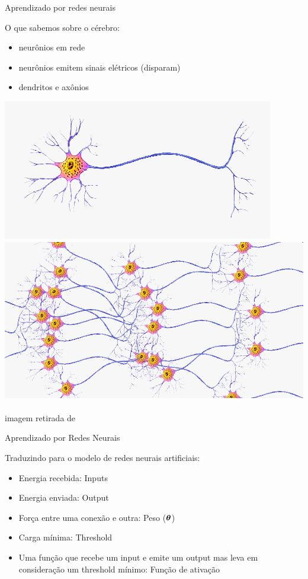 \documentclass[10pt]{beamer}
\begin{document}
\begin{frame}{Aprendizado por redes neurais}

O que sabemos sobre o cérebro:
\vspace{0.2cm}
\begin{itemize}
\item neurônios em rede
\vspace{0.2cm}
\item  neurônios emitem sinais elétricos (disparam)
\vspace{0.2cm}
\item dendritos e axônios


\end{itemize}

\includegraphics[width=.50\textwidth]{images/neuron.png}
\includegraphics[width=.50\textwidth]{images/neuronsnetwork.png}
\\
\\
\footnotesize{imagem retirada de \cite{metodosupera}}


\end{frame}



\begin{frame}{Aprendizado por Redes Neurais}

Traduzindo para o modelo de redes neurais artificiais:
\vspace{0.2cm}
\begin{itemize}
\item Energia recebida: \alert{Inputs}
\vspace{0.2cm}
\item  Energia enviada: \alert{Output}
\vspace{0.2cm}
\item  Força entre uma conexão e outra: \alert{Peso ($\bm{\theta}$)}
\vspace{0.2cm}

\item Carga mínima: \alert{Threshold}
\vspace{0.2cm}
\item Uma função que recebe um input e emite um output mas leva em consideração um threshold mínimo: \alert{Função de ativação}

\end{itemize}

\end{frame}
\end{document}
